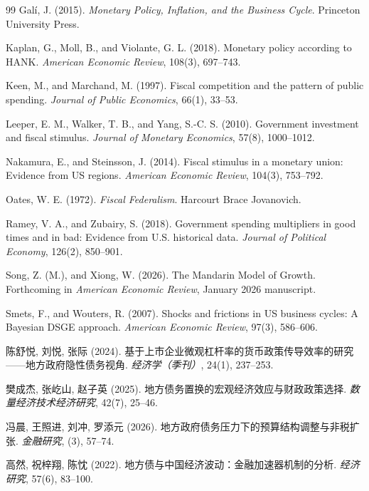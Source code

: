 \documentclass[12pt,UTF8]{ctexart}
\begin{document}
\begin{thebibliography}{99}
		Galí, J. (2015). \textit{Monetary Policy, Inflation, and the Business Cycle}. Princeton University Press.
		
		Kaplan, G., Moll, B., and Violante, G. L. (2018). Monetary policy according to HANK. \textit{American Economic Review}, 108(3), 697--743.
		
		Keen, M., and Marchand, M. (1997). Fiscal competition and the pattern of public spending. \textit{Journal of Public Economics}, 66(1), 33--53.
		
		Leeper, E. M., Walker, T. B., and Yang, S.-C. S. (2010). Government investment and fiscal stimulus. \textit{Journal of Monetary Economics}, 57(8), 1000--1012.
		
		Nakamura, E., and Steinsson, J. (2014). Fiscal stimulus in a monetary union: Evidence from US regions. \textit{American Economic Review}, 104(3), 753--792.
		
		Oates, W. E. (1972). \textit{Fiscal Federalism}. Harcourt Brace Jovanovich.
		
		Ramey, V. A., and Zubairy, S. (2018). Government spending multipliers in good times and in bad: Evidence from U.S. historical data. \textit{Journal of Political Economy}, 126(2), 850--901.
		
		Song, Z. (M.), and Xiong, W. (2026). The Mandarin Model of Growth. Forthcoming in \textit{American Economic Review}, January 2026 manuscript.
		
		Smets, F., and Wouters, R. (2007). Shocks and frictions in US business cycles: A Bayesian DSGE approach. \textit{American Economic Review}, 97(3), 586--606.
		
		陈舒悦, 刘悦, 张际 (2024). 基于上市企业微观杠杆率的货币政策传导效率的研究——地方政府隐性债务视角. \textit{经济学（季刊）}, 24(1), 237--253.
		
		樊成杰, 张屹山, 赵子英 (2025). 地方债务置换的宏观经济效应与财政政策选择. \textit{数量经济技术经济研究}, 42(7), 25--46.
		
		冯晨, 王照进, 刘冲, 罗添元 (2026). 地方政府债务压力下的预算结构调整与非税扩张. \textit{金融研究}, (3), 57--74.
		
		高然, 祝梓翔, 陈忱 (2022). 地方债与中国经济波动：金融加速器机制的分析. \textit{经济研究}, 57(6), 83--100.
		

\end{thebibliography}
\end{document}
